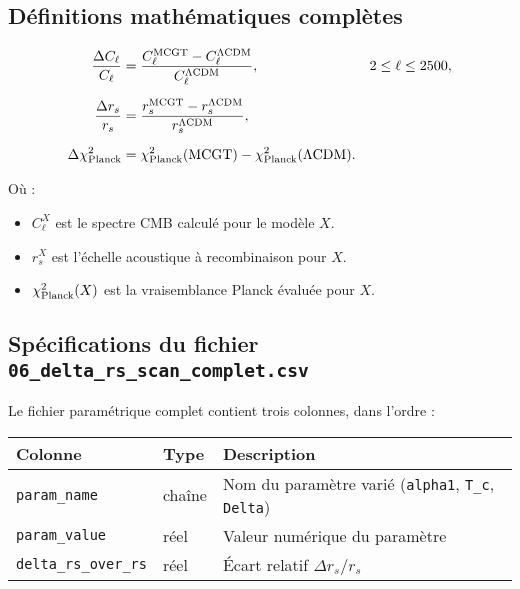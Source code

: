 \subsection{Définitions mathématiques complètes}

\begin{align}
  \frac{\Delta C_{\ell}}{C_{\ell}}
  &= \frac{C_{\ell}^{\mathrm{MCGT}} - C_{\ell}^{\Lambda\rm CDM}}
           {C_{\ell}^{\Lambda\rm CDM}},
  & 2 \le \ell \le 2500, \\[6pt]
  \frac{\Delta r_{s}}{r_{s}}
  &= \frac{r_{s}^{\mathrm{MCGT}} - r_{s}^{\Lambda\rm CDM}}
           {r_{s}^{\Lambda\rm CDM}}, \\[6pt]
  \Delta\chi^{2}_{\rm Planck}
  &= \chi^{2}_{\rm Planck}(\mathrm{MCGT})
   - \chi^{2}_{\rm Planck}(\Lambda\mathrm{CDM}).
\end{align}

\noindent
Où :
\begin{itemize}
  \item \(C_{\ell}^{X}\) est le spectre CMB calculé pour le modèle \(X\).
  \item \(r_{s}^{X}\) est l’échelle acoustique à recombinaison pour \(X\).
  \item \(\chi^{2}_{\rm Planck}(X)\) est la vraisemblance Planck évaluée pour \(X\).
\end{itemize}

\subsection{Spécifications du fichier \texttt{06\_delta\_rs\_scan\_complet.csv}}

Le fichier paramétrique complet contient trois colonnes, dans l’ordre :
\begin{center}
\begin{tabular}{l l l}
\toprule
\textbf{Colonne}     & \textbf{Type} & \textbf{Description}                               \\
\midrule
\texttt{param\_name} & chaîne        & Nom du paramètre varié (\texttt{alpha1}, \texttt{T\_c}, \texttt{Delta}) \\
\texttt{param\_value}& réel          & Valeur numérique du paramètre                     \\
\texttt{delta\_rs\_over\_rs} & réel    & Écart relatif \(\Delta r_{s}/r_{s}\)                \\
\bottomrule
\end{tabular}
\end{center}

